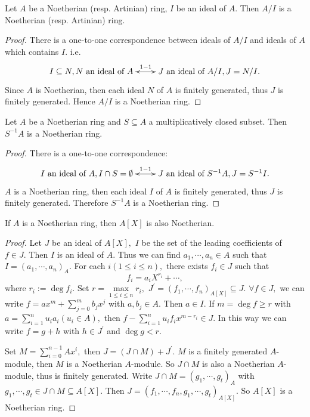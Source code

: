 \begin{prop}
Let $A$ be a Noetherian (resp. Artinian) ring, $I$ be an ideal of
$A.$ Then $A/I$ is a Noetherian (resp. Artinian) ring.
\end{prop}
\begin{proof}
There is a one-to-one correspondence between ideals of $A/I$ and
ideals of $A$ which contains $I.$ i.e.
\[ \xymatrix{
   I\subseteq N, N \text{ an ideal of }A \ar@{<->}[r]^-{1-1} &
   J \text{ an ideal of } A/I, J=N/I. }  \]
Since $A$ is Noetherian, then each ideal $N$ of $A$ is finitely
generated, thus $J$ is finitely generated. Hence $A/I$ is a
Noetherian ring.
\end{proof}
\begin{prop}
Let  $A$ be a Noetherian ring and $S\subseteq A$ a multiplicatively
closed subset. Then $S^{-1}A$ is a Noetherian ring.
\end{prop}
\begin{proof}
There is a one-to-one correspondence:
\[ \xymatrix{
   I \text{ an ideal of }A, I\cap S=\emptyset \ar@{<->}[r]^-{1-1} &
   J \text{ an ideal of } S^{-1}A, J=S^{-1}I. }  \]
$A$ is a Noetherian ring, then each ideal $I$ of $A$ is finitely
generated, thus $J$ is finitely generated. Therefore $S^{-1}A$ is a
Noetherian ring.
\end{proof}
\begin{thm}
If $A$ is a Noetherian ring, then $A[X]$ is also Noetherian.
\end{thm}
\begin{proof}
Let $J$ be an ideal of $A[X],$ $I$ be the set of the leading
coefficients of $f\in J.$ Then $I$ is an ideal of $A.$ Thus we can
find $a_1,\cdots,a_n\in A$ such that $I=(a_1,\cdots,a_n)_A.$ For
each $i(1\leqslant i\leqslant n),$ there exists $f_i\in J$ such that
$$f_i=a_iX^{r_i}+\cdots,$$
where $r_i:=\deg f_i.$ Set $r=\max\limits_{1\leqslant i\leqslant n}
r_i,$ $J^{\prime}=(f_1,\cdots,f_n)_{A[X]}\subseteq J.$ $\forall f\in
J,$ we can write $f=ax^m+\sum\limits_{j=0}^m b_jx^j$ with $a, b_j\in
A.$ Then $a\in I.$ If $m=\deg f\geqslant r$ with
$a=\sum\limits_{i=1}^n u_ia_i(u_i\in A),$ then
$f-\sum\limits_{i=1}^n u_if_ix^{m-r_i}\in J.$ In this way we can
write $f=g+h$ with $h\in J^{\prime}$ and $\deg g<r.$

Set $M=\sum\limits_{i=0}^{n-1} Ax^i,$ then $J=(J\cap M)+J^{\prime}.$
$M$ is a finitely generated $A$-module, then $M$ is a Noetherian
$A$-module. So $J\cap M$ is also a Noetherian $A$-module, thus is
finitely generated. Write $J\cap M=(g_1,\cdots,g_t)_A$ with
$g_1,\cdots,g_t\in J\cap M\subseteq A[X].$ Then
$J=(f_1,\cdots,f_n,g_1,\cdots,g_t)_{A[X]}.$ So $A[X]$ is a
Noetherian ring.
\end{proof}
